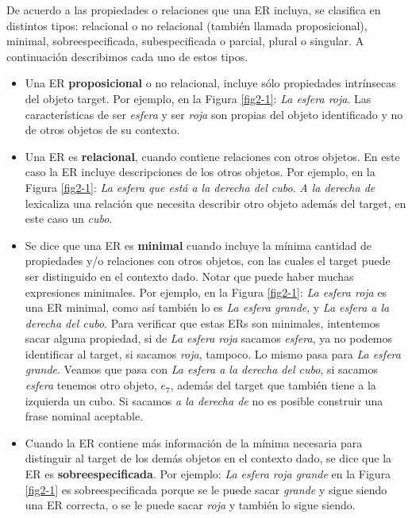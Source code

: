 De acuerdo a las propiedades o relaciones que una ER incluya, se clasifica en distintos tipos: relacional o no relacional (tambi\'en llamada proposicional), minimal, sobreespecificada, subespecificada o parcial, plural o singular. A continuaci\'on describimos cada uno de estos tipos.
\begin{itemize}
\item Una ER {\bf proposicional} o no relacional, incluye s\'olo propiedades intr\'insecas del objeto target. Por ejemplo, en la Figura \ref{fig2-1}: {\it La esfera roja}. Las caracter\'isticas de ser \emph{esfera} y ser \emph{roja} son propias del objeto identificado y no de otros objetos de su contexto.

\item Una ER es {\bf relacional}, cuando contiene relaciones con otros objetos. En este caso la ER incluye descripciones de los otros objetos. Por ejemplo, en la Figura \ref{fig2-1}: {\it La esfera que est\'a a la derecha del cubo}. {\it A la derecha de} lexicaliza una relaci\'on que necesita describir otro objeto adem\'as del target, en este caso un {\it cubo}.

\item \label{sec:minimales} Se dice que una ER es {\bf minimal} cuando incluye la m\'inima cantidad de propiedades y/o relaciones con otros objetos, con las cuales el target puede ser distinguido en el contexto dado. Notar que puede haber muchas expresiones minimales. Por ejemplo, en la Figura \ref{fig2-1}: {\it La esfera roja} es una ER minimal, como as\'i tambi\'en lo es {\it La esfera grande}, y {\it La esfera a la derecha del cubo}. Para verificar que estas ERs son minimales, intentemos sacar alguna propiedad, si de {\it La esfera roja} sacamos {\it esfera}, ya no podemos identificar al target, si sacamos {\it roja}, tampoco. Lo mismo pasa para {\it La esfera grande}. Veamos que pasa con {\it La esfera a la derecha del cubo}, si sacamos {\it esfera} tenemos otro objeto, $e_7$, adem\'as del target que tambi\'en tiene a la izquierda un cubo. Si sacamos {\it a la derecha de} no es posible construir una frase nominal aceptable. 

\item Cuando la ER contiene m\'as informaci\'on de la m\'inima necesaria para distinguir al target de los dem\'as objetos en el contexto dado, se dice que la ER es {\bf sobreespecificada}. Por ejemplo: {\it La esfera roja grande} en la Figura \ref{fig2-1} es sobreespecificada porque se le puede sacar {\it grande} y sigue siendo una ER correcta, o se le puede sacar {\it roja} y tambi\'en lo sigue siendo. \label{er-sobreespecificadas}


\end{itemize}
